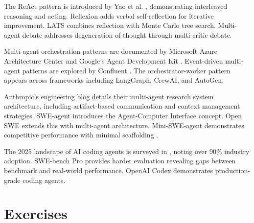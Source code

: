 The ReAct pattern is introduced by Yao et al. \cite{react2022}, demonstrating interleaved reasoning and acting. Reflexion \cite{reflexion2023} adds verbal self-reflection for iterative improvement. LATS \cite{lats2023} combines reflection with Monte Carlo tree search. Multi-agent debate \cite{mar2025} addresses degeneration-of-thought through multi-critic debate.

Multi-agent orchestration patterns are documented by Microsoft Azure Architecture Center \cite{msagentpatterns2025} and Google's Agent Development Kit \cite{googleadk2025}. Event-driven multi-agent patterns are explored by Confluent \cite{confluentmas2025}. The orchestrator-worker pattern appears across frameworks including LangGraph, CrewAI, and AutoGen.

Anthropic's engineering blog \cite{anthropicresearch2025} details their multi-agent research system architecture, including artifact-based communication and context management strategies. SWE-agent \cite{sweagent2024} introduces the Agent-Computer Interface concept. Open SWE \cite{openswe2025} extends this with multi-agent architecture. Mini-SWE-agent demonstrates competitive performance with minimal scaffolding \cite{springaibench2025}.

The 2025 landscape of AI coding agents is surveyed in \cite{sweevo2025}, noting over 90\% industry adoption. SWE-bench Pro \cite{swebenchpro2025} provides harder evaluation revealing gaps between benchmark and real-world performance. OpenAI Codex \cite{openaicodex2025} demonstrates production-grade coding agents.

\section*{Exercises}


